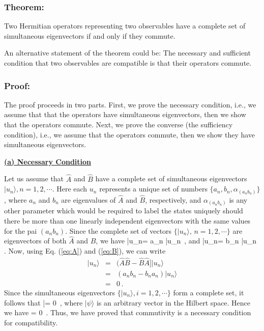 \subsubsection{Theorem: }
Two Hermitian operators representing two observables have a complete set of simultaneous eigenvectors if and only if they commute.

\noindent An alternative statement of the theorem could be: The necessary and sufficient condition that two observables are compatible is that their operators commute.

\subsubsection{Proof:}
The proof proceeds in two parts. First, we prove the necessary condition, i.e., we assume that that the operators have simultaneous eigenvectors, then we show that the operators commute. Next, we prove the converse (the sufficiency condition), i.e., we assume that
the operators commute, then we show they have simultaneous eigenvectors.

\newpage
\noindent
{\bf {\underline {(a) Necessary Condition}}}

Let us assume that $\hat{A}$ and $\hat{B}$ have a complete set of simultaneous eigenvectors $|u_n\rangle, n =1,2, \cdots$. Here each $u_n$ represents a unique set of numbers
 $\{a_n,b_n,\alpha_{(a_nb_n)}\}$, where $a_n$ and $b_n$ are eigenvalues of $\hat{A}$ and $\hat{B}$, respectively, and $\alpha_{(a_nb_n)}$ is any other parameter which would be required to label the states uniquely should there be more than one linearly independent eigenvectors with the same values for the pai $(a_nb_n)$. Since the complete set of vectors 
$\{|u_n\rangle,\, n= 1,2, \cdots\}$ are eigenvectors of both
$\hat{A}$ and $\hat{B}$, we have
\be
{}|u_n\rangle = a_n |u_n\rangle\, ,
\label{eq:A}
\ee
and
\be
{}|u_n\rangle = b_n |u_n\rangle\, .
\label{eq:B}
\ee
Now, using Eq. (\ref{eq:A}) and (\ref{eq:B}), we can write
\begin{eqnarray}
[\hat{A},\hat{B}]|u_n\rangle &= & (\hat{A}\hat{B}-\hat{B}\hat{A}]|u_n\rangle \nonumber \\
                             &=& (a_nb_n-b_na_n)|u_n\rangle \nonumber \\
														 & = & 0\,.
\end{eqnarray}
Since the simultaneous eigenvectors $\{|u_n\rangle, i= 1,2, \cdots\}$ form a complete set, it follows that
|\psi\rangle = 0\, ,
\ee
where $|\psi\rangle$ is an arbitrary vector in the Hilbert space. Hence we have
 = 0\, .
\ee
Thus, we have proved that commutivity is a necessary condition for compatibility.


